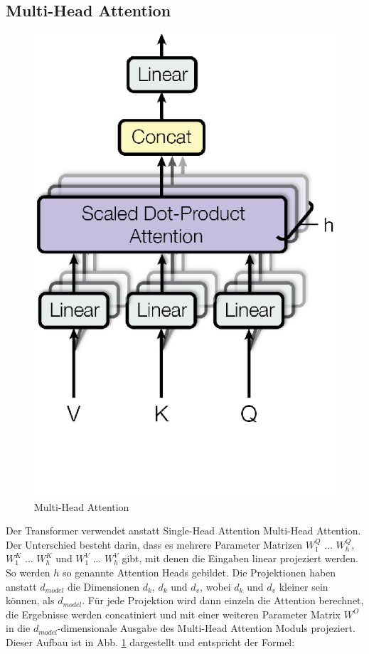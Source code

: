 \documentclass[conference]{IEEEtran}
\begin{document}
\subsection{Multi-Head Attention}
\begin{figure}[htbp]
\centerline{\includegraphics{img/multi_head_attention.png}}
\caption{Multi-Head Attention \cite{attention_is_all_you_need}}
\label{fig:3}
\end{figure}
Der Transformer verwendet anstatt Single-Head Attention Multi-Head Attention. Der Unterschied besteht darin, dass es mehrere Parameter Matrizen $W_1^Q$ ... $W_h^Q$, $W_1^K$ ... $W_h^K$ und $W_1^V$ ... $W_h^V$ gibt, mit denen die Eingaben linear projeziert werden. So werden $h$ so genannte Attention Heads gebildet. Die Projektionen haben anstatt $d_{model}$ die Dimensionen $d_k$, $d_k$ und $d_v$, wobei $d_k$ und $d_v$ kleiner sein können, als $d_{model}$. Für jede Projektion wird dann einzeln die Attention berechnet, die Ergebnisse werden concatiniert und mit einer weiteren Parameter Matrix $W^O$ in die $d_{model}$-dimensionale Ausgabe des Multi-Head Attention Moduls projeziert. Dieser Aufbau ist in Abb. \ref{fig:3} dargestellt und entspricht der Formel:
\end{document}
